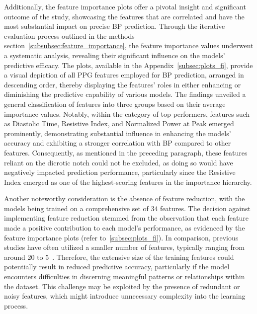 Additionally, the feature importance plots offer a pivotal insight and significant outcome of the study, showcasing the features that are correlated and have the most substantial impact on precise BP prediction.
Through the iterative evaluation process outlined in the methods section~\ref{subsubsec:feature_importance}, the feature importance values underwent a systematic analysis,
revealing their significant influence on the models' predictive efficacy.
The plots, available in the Appendix~\ref{subsec:plots_fi}, provide a visual depiction of all PPG features employed for BP prediction, arranged in descending order,
thereby displaying the features' roles in either enhancing or diminishing the predictive capability of various models.
The findings unveiled a general classification of features into three groups based on their average importance values.
Notably, within the category of top performers, features such as Diastolic Time, Resistive Index, and Normalized Power at Peak emerged prominently,
demonstrating substantial influence in enhancing the models' accuracy and exhibiting a stronger correlation with BP compared to other features.
Consequently, as mentioned in the preceding paragraph, these features reliant on the dicrotic notch could not be excluded, as doing so would have negatively impacted prediction performance,
particularly since the Resistive Index emerged as one of the highest-scoring features in the importance hierarchy.

Another noteworthy consideration is the absence of feature reduction, with the models being trained on a comprehensive set of 34 features.
The decision against implementing feature reduction stemmed from the observation that each feature made a positive contribution to each model's performance,
as evidenced by the feature importance plots (refer to~\ref{subsec:plots_fi}).
In comparison, previous studies have often utilized a smaller number of features, typically ranging from around 20 to 5~\cite{el-hajjDeepLearningModels2021, charltonAssessingHemodynamicsPhotoplethysmogram2022, yilmazNocturnalBloodPressure2023}.
Therefore, the extensive size of the training features could potentially result in reduced predictive accuracy,
particularly if the model encounters difficulties in discerning meaningful patterns or relationships within the dataset.
This challenge may be exploited by the presence of redundant or noisy features, which might introduce unnecessary complexity into the learning process.

\vspace{-0.5cm}
